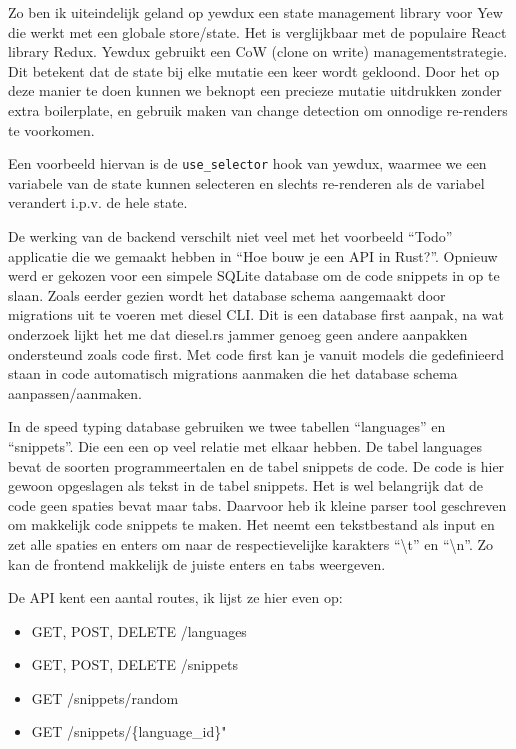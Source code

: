 Zo ben ik uiteindelijk geland op yewdux een state management library voor Yew die werkt met een
globale store/state. Het is verglijkbaar met de populaire React library Redux. Yewdux gebruikt een
CoW (clone on write) managementstrategie. Dit betekent dat de state bij elke mutatie een keer wordt
gekloond. Door het op deze manier te doen kunnen we beknopt een precieze mutatie uitdrukken zonder
extra boilerplate, en gebruik maken van change detection om onnodige re-renders te voorkomen. 

Een voorbeeld hiervan is de \texttt{use_selector} hook van yewdux, waarmee we een
variabele van de state kunnen selecteren en slechts re-renderen als de variabel verandert i.p.v. de
hele state.

De werking van de backend verschilt niet veel met het voorbeeld “Todo” applicatie die we gemaakt
hebben in “Hoe bouw je een API in Rust?”. Opnieuw werd er gekozen voor een simpele SQLite database
om de code snippets in op te slaan. Zoals eerder gezien wordt het database schema aangemaakt door
migrations uit te voeren met diesel CLI.  Dit is een database first aanpak, na wat onderzoek lijkt
het me dat diesel.rs jammer genoeg geen andere aanpakken ondersteund zoals code first. Met code
first kan je vanuit models die gedefinieerd staan in code automatisch migrations aanmaken die het
database schema aanpassen/aanmaken. 

In de speed typing database gebruiken we twee tabellen “languages” en “snippets”. Die een een op
veel relatie met elkaar hebben. De tabel languages bevat de soorten programmeertalen en de tabel
snippets de code. De code is hier gewoon opgeslagen als tekst in de tabel snippets. Het is wel
belangrijk dat de code geen spaties bevat maar tabs. Daarvoor heb ik kleine parser tool geschreven
om makkelijk code snippets te maken. Het neemt een tekstbestand als input en zet alle spaties en
enters om naar de respectievelijke karakters “\textbackslash t” en “\textbackslash n”. Zo kan de
frontend makkelijk de juiste enters en tabs weergeven. 

De API kent een aantal routes, ik lijst ze hier even op: 
\begin{itemize}
    \item GET, POST, DELETE  /languages
    \item GET, POST, DELETE /snippets 
    \item GET /snippets/random 
    \item GET /snippets/\{language\_id\}"
\end{itemize}

